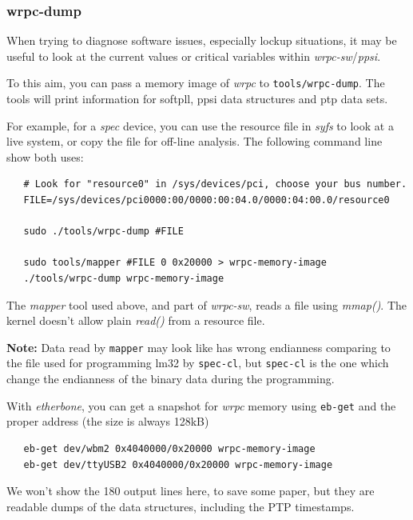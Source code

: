 \documentclass[a4paper, 12pt]{article}
\begin{document}
\subsubsection{wrpc-dump}

When trying to diagnose software issues, especially lockup situations,
it may be useful to look at the current values or critical variables
within \textit{wrpc-sw}/\textit{ppsi}.

To this aim, you can pass a memory image of \textit{wrpc} to \texttt{tools/wrpc-dump}.
The tools will print information for softpll, ppsi data structures
and ptp data sets.

For example, for a \textit{spec} device, you can use the resource file in
\textit{syfs} to look at a live system, or copy the file for off-line
analysis. The following command line show both uses:

\begin{lstlisting}
   # Look for "resource0" in /sys/devices/pci, choose your bus number.
   FILE=/sys/devices/pci0000:00/0000:00:04.0/0000:04:00.0/resource0

   sudo ./tools/wrpc-dump #FILE

   sudo tools/mapper #FILE 0 0x20000 > wrpc-memory-image
   ./tools/wrpc-dump wrpc-memory-image
\end{lstlisting}

The \textit{mapper} tool used above, and part of \textit{wrpc-sw}, reads a file
using \textit{mmap()}. The kernel doesn't allow plain \textit{read()} from a
resource file.

\textbf{Note:} Data read by \texttt{mapper} may look like has wrong endianness comparing
to the file used for programming lm32 by \texttt{spec-cl}, but \texttt{spec-cl} is the
one which change the endianness of the binary data during the programming.

With \textit{etherbone}, you can get a snapshot for \textit{wrpc} memory using
\texttt{eb-get} and the proper address (the size is always 128kB)

\begin{lstlisting}
   eb-get dev/wbm2 0x4040000/0x20000 wrpc-memory-image
   eb-get dev/ttyUSB2 0x4040000/0x20000 wrpc-memory-image
\end{lstlisting}

We won't show the 180 output lines here, to save some paper, but they
are readable dumps of the data structures, including the PTP timestamps.

\label{spll Softpll Timing}
\end{document}
